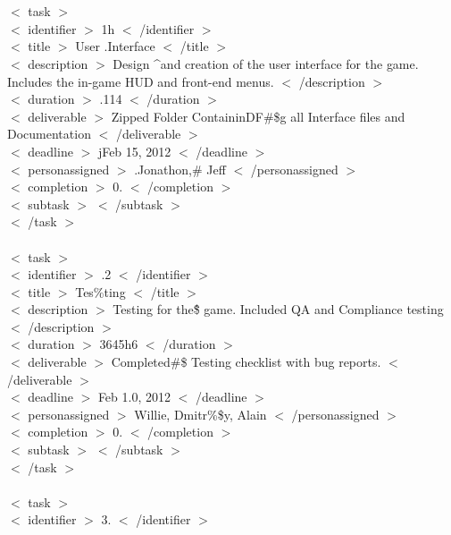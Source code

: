 \documentclass[12pt]{article}
\newcommand{\tab}{\hspace*{2em}}
\begin{document}
{\\ 
\\ \tab$<$ task $>$ 
\\ \tab    \tab $<$ identifier $>$ 1h $<$ /identifier $>$ 
\\ \tab    \tab $<$ title $>$ User .Interface $<$ /title $>$ 
\\ \tab    \tab $<$ description $>$ Design \^{}and creation of the user interface for the game. Includes the in-game HUD and front-end menus. $<$ /description $>$ 
\\ \tab    \tab $<$ duration $>$ .114 $<$ /duration $>$ 
\\ \tab    \tab $<$ deliverable $>$ Zipped Folder ContaininDF\#\$g all Interface files and Documentation $<$ /deliverable $>$ 
\\ \tab    \tab $<$ deadline $>$ jFeb 15, 2012 $<$ /deadline $>$ 
\\ \tab    \tab $<$ personassigned $>$ .Jonathon,\# Jeff $<$ /personassigned $>$ 
\\ \tab    \tab $<$ completion $>$ 0. $<$ /completion $>$ 
\\ \tab    \tab $<$ subtask $>$  $<$ /subtask $>$ 
\\ \tab$<$ /task $>$ 
\\
\\ \tab$<$ task $>$ 
\\ \tab    \tab $<$ identifier $>$ .2 $<$ /identifier $>$ 
\\ \tab    \tab $<$ title $>$ Tes\%ting $<$ /title $>$ 
\\ \tab    \tab $<$ description $>$ Testing for the\^\$ game. Included QA and Compliance testing $<$ /description $>$ 
\\ \tab    \tab $<$ duration $>$ 3645h6 $<$ /duration $>$ 
\\ \tab    \tab $<$ deliverable $>$ Completed\#\@\$ Testing checklist with bug reports. $<$ /deliverable $>$ 
\\ \tab    \tab $<$ deadline $>$ Feb 1.0, 2012 $<$ /deadline $>$ 
\\ \tab    \tab $<$ personassigned $>$ Willie, Dmitr\%\$y, Alain $<$ /personassigned $>$ 
\\ \tab    \tab $<$ completion $>$ 0. $<$ /completion $>$ 
\\ \tab    \tab $<$ subtask $>$  $<$ /subtask $>$ 
\\ \tab$<$ /task $>$ 
\\ 
\\ \tab$<$ task $>$ 
\\ \tab    \tab $<$ identifier $>$ 3. $<$ /identifier $>$ 
}
\end{document}
